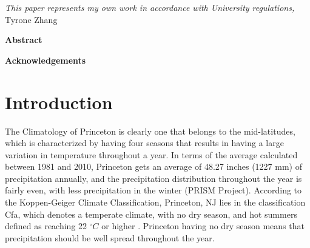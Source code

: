 \documentclass[11pt]{report}
\begin{document}



\thispagestyle{empty}
\vspace*{3in}
\begin{center}
\emph{This paper represents my own work in accordance with University regulations,} \\
Tyrone Zhang %
\end{center}
\clearpage

\begin{center}
\Large \textbf{Abstract}
\end{center}
 
 \clearpage

\begin{center}
\Large \textbf{Acknowledgements}
\end{center}

\clearpage

\thispagestyle{empty}
\tableofcontents
\clearpage

\listoffigures 
\listoftables
\clearpage

\fancyhead{}
\fancyfoot{}
\pagestyle{fancyplain}

{\newpage\renewcommand{\thepage}{\arabic{page}}\setcounter{page}{1}}


\section{Introduction \label{sec:introduction}}
The Climatology of Princeton is clearly one that belongs to the mid-latitudes, which is characterized by having four seasons that results in having a large variation in temperature throughout a year. In terms of the average calculated between 1981 and 2010, Princeton gets an average of 48.27 inches (1227 mm) of precipitation annually, and the precipitation distribution throughout the year is fairly even, with less precipitation in the winter (PRISM Project).  According to the Koppen-Geiger Climate Classification, Princeton, NJ lies in the classification Cfa, which denotes a temperate climate, with no dry season, and hot summers defined as reaching 22 $^\circ C $ or higher \cite{Peel2008}. Princeton having no dry season means that precipitation should be well spread throughout the year. 
\end{document}
